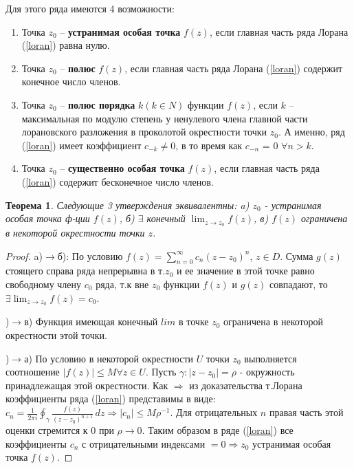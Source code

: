 \documentclass{article}
\newtheorem{theorem}{Теорема}
\begin{document}
Для этого ряда имеются 4 возможности:
\begin{enumerate}
    \item Точка $z_0$ – \textbf{устранимая особая точка} $f(z)$, если главная часть ряда Лорана (\ref{loran}) равна нулю.
    \item Точка $z_0$ – \textbf{полюс} $f(z)$, если главная часть ряда Лорана (\ref{loran}) содержит конечное число членов.    
    \item Точка $z_0$ – \textbf{полюс порядка} $k (k \in N)$ функции $f(z)$, если $k$
– максимальная по модулю степень у ненулевого члена главной части лорановского разложения в проколотой окрестности точки $z_0$. А именно, ряд (\ref{loran}) имеет коэффициент $c_{-k}\neq 0$,
в то время как $c_{-n}$ = 0 $\forall n > k$.
    \item Точка $z_0$ – \textbf{существенно особая точка} $f(z)$, если
главная часть ряда (\ref{loran}) содержит бесконечное число членов.
\end{enumerate}
\begin{theorem}
   Следующие 3 утверждения эквивалентны: a) $z_0$ - устранимая особая точка ф-ции $f(z)$, б) $\exists$ конечный $\displaystyle\lim_{z\rightarrow z_0}f(z)$, в) $f(z)$ ограничена в некоторой окрестности точки $z$.
\end{theorem}
\begin{proof}
    a)$\rightarrow$б): По условию $f(z)=\sum_{n=0}^{\infty}c_n(z-z_0)^n$, $z \in D$. Сумма $g(z)$ стоящего справа ряда непрерывна в т.$z_0$ и ее значение в этой точке равно свободному члену $c_0$ ряда, т.к вне $z_0$ функции $f(z)$ и $g(z)$ совпадают, то $\exists \displaystyle\lim_{z\rightarrow z_0}f(z)=c_0$.
    
    )$\rightarrow$в) Функция имеющая конечный $lim$ в точке $z_0$ ограничена в некоторой окрестности этой точки.

    )$\rightarrow$а) По условию в некоторой окрестности $U$ точки $z_0$ выполняется соотношение $|f(z)|\leq M \forall z \in U$. Пусть $\gamma:|z-z_0|=\rho$ - окружность принадлежащая этой окрестности. Как $\Rightarrow$ из доказательства т.Лорана коэффициенты ряда (\ref{loran}) представимы в виде: $c_n = \frac{1}{2\pi i} \oint_{\gamma} \frac{f(z)}{(z-z_0)^{n+1}} \,dz \Rightarrow |c_n|\leq M\rho^{-1}$. Для отрицательных $n$ правая часть этой оценки стремится к 0 при $\rho \rightarrow 0$. Таким образом в ряде (\ref{loran}) все коэффициенты $c_n$ с отрицательными индексами $=0\Rightarrow z_0$ устранимая особая точка $f(z)$. 
\end{proof}
\end{document}
